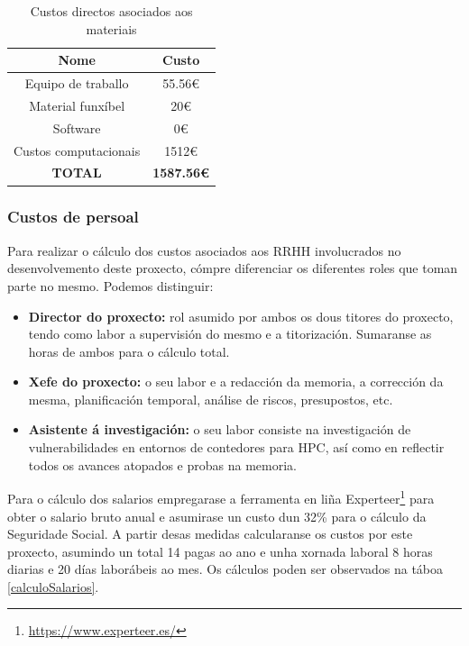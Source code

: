 \begin{table}[]
\centering
\caption{Custos directos asociados aos materiais}
\label{custosDirectosMateriais}
\begin{tabular}{|c|c|}
\hline
\textbf{Nome} & \textbf{Custo} \\ \hline
Equipo de traballo & 55.56\euro \\ \hline
Material funxíbel & 20\euro \\ \hline
Software & 0\euro \\ \hline
Custos computacionais & 1512\euro \\ \hline \hline
\textbf{TOTAL} & \textbf{1587.56\euro} \\ \hline
\end{tabular}
\end{table}

\subsubsection{Custos de persoal}
\label{custosPersoaisDirectos}

Para realizar o cálculo dos custos asociados aos \gls{RRHH} involucrados no desenvolvemento deste proxecto, cómpre diferenciar os diferentes roles que toman parte no mesmo. Podemos distinguir:

\begin{itemize}
    \item \textbf{Director do proxecto:} rol asumido por ambos os dous titores do proxecto, tendo como labor a supervisión do mesmo e a titorización. Sumaranse as horas de ambos para o cálculo total.
    \item \textbf{Xefe do proxecto:} o seu labor e a redacción da memoria, a corrección da mesma, planificación temporal, análise de riscos, presupostos, etc.
    \item \textbf{Asistente á investigación:} o seu labor consiste na investigación de vulnerabilidades en entornos de contedores para \gls{HPC}, así como en reflectir todos os avances atopados e probas na memoria.
\end{itemize}

Para o cálculo dos salarios empregarase a ferramenta en liña Experteer\footnote{\url{https://www.experteer.es/}} para obter o salario bruto anual e asumirase un custo dun 32\% para o cálculo da Seguridade Social.  A partir desas medidas calcularanse os custos por este proxecto, asumindo un total 14 pagas ao ano e unha xornada laboral 8 horas diarias e 20 días laborábeis ao mes. Os cálculos poden ser observados na táboa \ref{calculoSalarios}.

